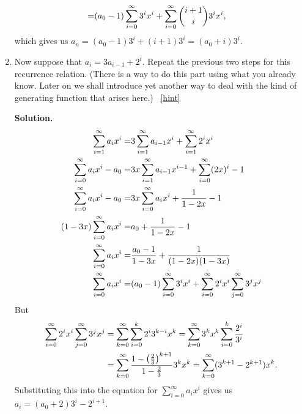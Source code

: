 \documentclass{book}
\begin{document}
\begin{activity}[]
\begin{enumerate}[font=\bfseries,label=(\alph*),ref=\alph*]
\begin{align*}
=& (a_0-1)\sum_{i=0}^\infty 3^ix^i +\sum_{i=0}^\infty \binom{i+1}{i}3^ix^i,
\end{align*}
which gives us \(a_n=(a_0-1) 3^i + (i+1)3^i=(a_0+i)3^i\).%
\item\label{task-249} \hypertarget{p-1406}{}%
Now suppose that \(a_i=3a_{i-1} + 2^i\).  Repeat the previous two steps for this recurrence relation.  (There is a way to do this part using what you already know.  Later on we shall introduce yet another way to deal with the kind of generating function that arises here.)%
~\hfill{\tiny\hyperlink{a-258.c}{[hint]}\hypertarget{q-258.c}{}}\par\smallskip%
\noindent\textbf{Solution.}\hypertarget{solution-195}{}\quad%
\hypertarget{p-1408}{}%
%
\begin{align*}
\sum_{i=1}^\infty a_ix^i =& 3\sum_{i=1}^\infty
a_{i-1}x^i +\sum_{i=1}^\infty 2^ix^i\\
\sum_{i=0}^\infty a_ix^i -a_0  =& 3x\sum_{i=1}^\infty a_{i-1}x^{i-1}
+\sum_{i=0}^\infty (2x)^i -1\\
\sum_{i=0}^\infty a_ix^i -a_0  =& 3x\sum_{i=0}^\infty a_ix^i +\frac{1}{1-2x} -1\\
(1-3x)\sum_{i=0}^\infty a_ix^i =& a_0 +\frac{1}{1-2x}-1\\
\sum_{i=0}^\infty a_ix^i =&  \frac{a_0-1}{1-3x}+\frac{1}{(1-2x)(1-3x)}\\
\sum_{i=0}^\infty a_ix^i =& (a_0-1)\sum_{i=0}^\infty 3^ix^i +\sum_{i=0}^\infty
2^ix^i\sum_{j=0}^\infty 3^jx^j
\end{align*}
But%
\begin{align*}
\sum_{i=0}^\infty
2^ix^i\sum_{j=0}^\infty 3^jx^j&=
\sum_{k=0}^\infty
\sum_{i=0}^k 2^i3^{k-i}x^k=
\sum_{k=0}^\infty3^kx^k
\sum_{i=0}^k \frac{2^i}{3^i}\\
&=\sum_{k=0}^\infty \frac{1-\left(\frac{2}{3}\right)^{k+1}}{1-\frac{2}{3}}3^kx^k =\sum_{k=0}^\infty
(3^{k+1}-2^{k+1})x^k\text{.}
\end{align*}
Substituting this into the equation for \(\sum_{i=0}^\infty a_ix^i\) gives us \(a_i =(a_0+2)3^i -2^{i+1}\).%
\end{enumerate}
\end{activity}
\end{document}
